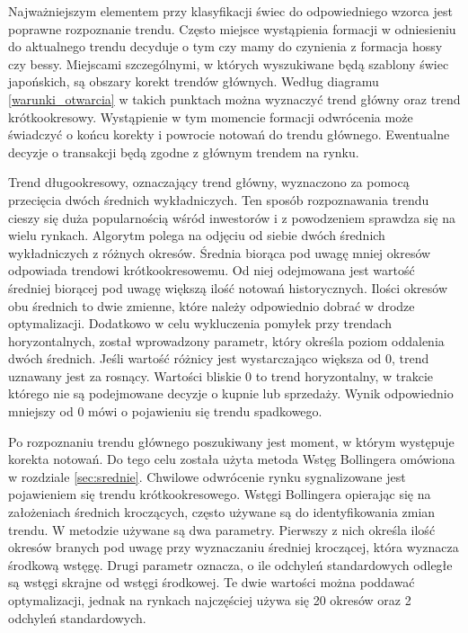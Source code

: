 \documentclass[pdflatex,11pt]{aghdpl}
\begin{document}
Najważniejszym elementem przy klasyfikacji świec do odpowiedniego wzorca jest poprawne rozpoznanie trendu. Często miejsce wystąpienia formacji w odniesieniu do aktualnego trendu decyduje o tym czy mamy do czynienia z formacja hossy czy bessy.  Miejscami szczególnymi, w których wyszukiwane będą szablony świec japońskich, są obszary korekt trendów głównych. Według diagramu \ref{warunki_otwarcia} w takich punktach można wyznaczyć trend główny oraz trend krótkookresowy. Wystąpienie w tym momencie formacji odwrócenia może świadczyć o końcu korekty i powrocie notowań do trendu głównego. Ewentualne decyzje o transakcji będą zgodne z głównym trendem na rynku.

Trend długookresowy, oznaczający trend główny, wyznaczono za pomocą przecięcia dwóch średnich wykładniczych. Ten sposób rozpoznawania trendu cieszy się duża popularnością wśród inwestorów i z powodzeniem sprawdza się na wielu rynkach.  Algorytm polega na odjęciu od siebie dwóch średnich wykładniczych z różnych okresów. Średnia biorąca pod uwagę mniej okresów odpowiada trendowi krótkookresowemu. Od niej odejmowana jest wartość średniej biorącej pod uwagę większą ilość notowań historycznych. Ilości okresów obu średnich to dwie zmienne, które należy odpowiednio dobrać w drodze optymalizacji. Dodatkowo w celu wykluczenia pomyłek przy trendach horyzontalnych, został wprowadzony parametr, który określa poziom oddalenia dwóch średnich. Jeśli wartość różnicy jest wystarczająco większa od 0, trend uznawany jest za rosnący. Wartości bliskie 0 to trend horyzontalny, w trakcie którego nie są podejmowane decyzje o kupnie lub sprzedaży. Wynik odpowiednio mniejszy od 0 mówi o pojawieniu się trendu spadkowego. 

Po rozpoznaniu trendu głównego poszukiwany jest moment, w którym występuje korekta notowań. Do tego celu została użyta metoda Wstęg Bollingera omówiona w rozdziale \ref{sec:srednie}. Chwilowe odwrócenie rynku sygnalizowane jest pojawieniem się trendu krótkookresowego. Wstęgi Bollingera opierając się na założeniach średnich kroczących, często używane są do identyfikowania zmian trendu. W metodzie używane są dwa parametry. Pierwszy z nich określa ilość okresów branych pod uwagę przy wyznaczaniu średniej kroczącej, która wyznacza środkową wstęgę. Drugi parametr oznacza, o ile odchyleń standardowych odległe są wstęgi skrajne od wstęgi środkowej. Te dwie wartości można poddawać optymalizacji, jednak na rynkach najczęściej używa się 20 okresów oraz 2 odchyleń standardowych. 
\end{document}
